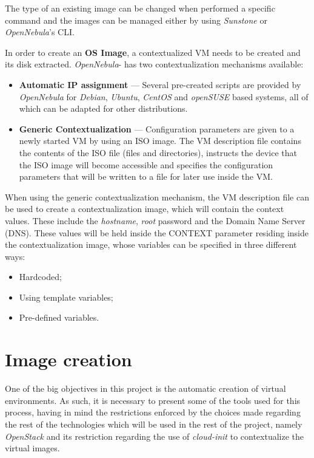 The type of an existing image can be changed when performed a specific command and the images can be managed either by using \textit{Sunstone} or \textit{OpenNebula}'s CLI.

In order to create an \textbf{OS Image}, a contextualized VM needs to be created and its disk extracted.
\textit{OpenNebula}- has two contextualization mechanisms available:

\begin{itemize}
\item \textbf{Automatic IP assignment} --- Several pre-created scripts are provided by \textit{OpenNebula} for \textit{Debian}, \textit{Ubuntu}, \textit{CentOS} and \textit{openSUSE} based systems, all of which can be adapted for other distributions.
\item \textbf{Generic Contextualization} --- Configuration parameters are given to a newly started VM by using an ISO image. The VM description file contains the contents of the ISO file (files and directories), instructs the device that the ISO image will become accessible and specifies the configuration parameters that will be written to a file for later use inside the VM.
\end{itemize}

When using the generic contextualization mechanism, the VM description file can be used to create a contextualization image, which will contain the context values. These include the \textit{hostname}, \textit{root} password and the Domain Name Server (DNS). These values will be held inside the CONTEXT parameter residing inside the contextualization image, whose variables can be specified in three different ways:

\begin{itemize}
\item Hardcoded;
\item Using template variables;
\item Pre-defined variables.~\cite{nebula-contextualization}
\end{itemize}

\clearpage
\section{Image creation} \label{sec:iso}

One of the big objectives in this project is the automatic creation of virtual environments. As such, it is necessary to present some of the tools used for this process, having in mind the restrictions enforced by the choices made regarding the rest of the technologies which will be used in the rest of the project, namely \textit{OpenStack} and its restriction regarding the use of \textit{cloud-init} to contextualize the virtual images.

